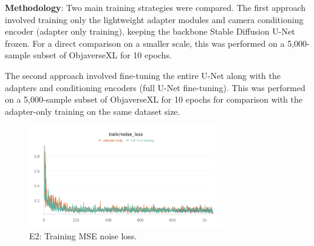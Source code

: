\textbf{Methodology}:
Two main training strategies were compared. The first approach involved training only the lightweight adapter modules and camera conditioning encoder (adapter only training), keeping the backbone Stable Diffusion U-Net frozen. For a direct comparison on a smaller scale, this was performed on a 5,000-sample subset of ObjaverseXL for 10 epochs.

The second approach involved fine-tuning the entire U-Net along with the adapters and conditioning encoders (full U-Net fine-tuning). This was performed on a 5,000-sample subset of ObjaverseXL for 10 epochs for comparison with the adapter-only training on the same dataset size.

\begin{figure}[htbp]
  \centering
  \includegraphics[width=0.75\textwidth]{images/experiments/adapter_vs_full/train_loss.png}
  \caption{E2: Training MSE noise loss.}
  \label{fig:exp_adap_vs_full_fid}
\end{figure}

